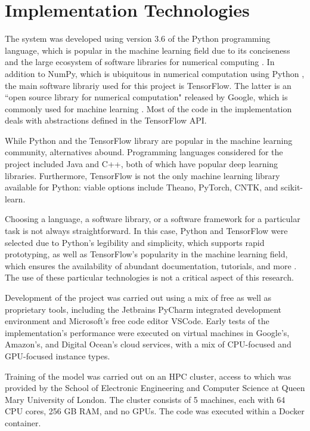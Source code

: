 \documentclass[12pt, titlepage]{report}
\theoremstyle{definition}
\begin{document}
\section{Implementation Technologies}
The system was developed using version 3.6 of the Python programming language, which is popular in the machine learning field due to its conciseness and the large ecosystem of software libraries for numerical computing \cite{numpy}. In addition to NumPy, which is ubiquitous in numerical computation using Python \cite{numpy}, the main software librariy used for this project is TensorFlow. The latter is an ``open source library for numerical computation" released by Google, which is commonly used for machine learning \cite{tensorflow}. Most of the code in the implementation deals with abstractions defined in the TensorFlow API.

While Python and the TensorFlow library are popular in the machine learning community, alternatives abound. Programming languages considered for the project included Java and C++, both of which have popular deep learning libraries. Furthermore, TensorFlow is not the only machine learning library available for Python: viable options include Theano, PyTorch, CNTK, and scikit-learn.

Choosing a language, a software library, or a software framework for a particular task is not always straightforward. In this case, Python and TensorFlow were selected due to Python's legibility and simplicity, which supports rapid prototyping, as well as TensorFlow's popularity in the machine learning field, which ensures the availability of abundant documentation, tutorials, and more \cite{bhatia2017why}. The use of these particular technologies is not a critical aspect of this research.

Development of the project was carried out using a mix of free as well as proprietary tools, including the Jetbrains PyCharm integrated development environment and Microsoft's free code editor VSCode. Early tests of the implementation's performance were executed on virtual machines in Google's, Amazon's, and Digital Ocean's cloud services, with a mix of CPU-focused and GPU-focused instance types.

Training of the model was carried out on an HPC cluster, access to which was provided by the School of Electronic Engineering and Computer Science at Queen Mary University of London. The cluster consists of 5 machines, each with 64 CPU cores, 256 GB RAM, and no GPUs. The code was executed within a Docker container.
\end{document}
